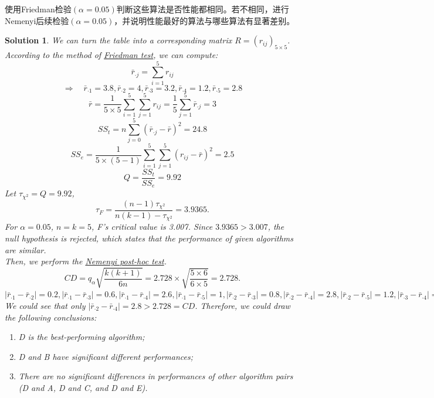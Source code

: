 \documentclass[a4paper,UTF8]{article}
\numberwithin{equation}{section}
\newtheorem*{mySol}{Solution}
\begin{document}
使用Friedman检验$(\alpha=0.05)$判断这些算法是否性能都相同。若不相同，进行Nemenyi后续检验$(\alpha=0.05)$，并说明性能最好的算法与哪些算法有显著差别。
\begin{mySol}
We can turn the table into a corresponding matrix $R=(r_{ij})_{5 \times 5}$.\\
According to the method of \href{https://en.wikipedia.org/wiki/Friedman_test}{Friedman test}, we can compute:
$$\bar{r}_{\cdot j}=\sum \limits_{i=1}^5 r_{ij}$$
$$\Rightarrow \quad \bar{r}_{\cdot 1}=3.8, \bar{r}_{\cdot 2}=4, \bar{r}_{\cdot 3}=3.2, \bar{r}_{\cdot 4}=1.2, \bar{r}_{\cdot 5}=2.8$$
$$\bar{r} = \frac{1}{5 \times 5}\sum \limits_{i=1}^5 \sum \limits_{j=1}^5 r_{ij} = \frac{1}{5}\sum \limits_{j=1}^5\bar{r}_{\cdot j}=3$$
$$SS_t=n\sum \limits_{j=0}^5 (\bar{r}_{\cdot j} -\bar{r})^2=24.8$$
$$SS_e=\frac{1}{5\times (5-1)}\sum \limits_{i=1}^5 \sum \limits_{j=1}^5 (r_{ij} -\bar{r})^2=2.5$$
$$Q=\frac{SS_t}{SS_e}=9.92$$
Let $\tau_{\chi^2} = Q = 9.92$, 
$$\tau_F = \frac{(n-1)\tau_{\chi^2}}{n(k-1)-\tau_{\chi^2}}=3.9365.$$
For $\alpha=0.05$, $n=k=5$, F's critical value is 3.007. Since $3.9365>3.007$,  the null hypothesis is rejected, which states that the performance of given algorithms are similar.\\
Then, we perform the \href{https://en.wikipedia.org/wiki/Nemenyi_test}{Nemenyi post-hoc test}.
$$CD=q_\alpha  \sqrt{\frac{k(k+1)}{6n}}=2.728  \times \sqrt{\frac{5\times 6}{6 \times 5}}= 2.728.$$
$|\bar{r}_{\cdot 1}-\bar{r}_{\cdot 2}| =0.2,
|\bar{r}_{\cdot 1}-\bar{r}_{\cdot 3}| = 0.6,
|\bar{r}_{\cdot 1}-\bar{r}_{\cdot 4}| = 2.6,
|\bar{r}_{\cdot 1}-\bar{r}_{\cdot 5}| = 1,
|\bar{r}_{\cdot 2}-\bar{r}_{\cdot 3}| =0.8,   
|\bar{r}_{\cdot 2}-\bar{r}_{\cdot 4}| = 2.8,  
|\bar{r}_{\cdot 2}-\bar{r}_{\cdot 5}| = 1.2,  
|\bar{r}_{\cdot 3}-\bar{r}_{\cdot 4}| =2,   
|\bar{r}_{\cdot 3}-\bar{r}_{\cdot 5}| = 0.4.  
|\bar{r}_{\cdot 4}-\bar{r}_{\cdot 5}| = 1.6,$\\
We could see that only $|\bar{r}_{\cdot 2}-\bar{r}_{\cdot 4}| = 2.8>2.728=CD$. Therefore, we could draw the following conclusions:\\
\begin{enumerate}[1.]
\item D is the best-performing algorithm;
\item D and B have significant different performances;
\item There are no significant differences in performances of other algorithm pairs (D and A, D and C, and D and E).
\end{enumerate}
\end{mySol}
\end{document}
